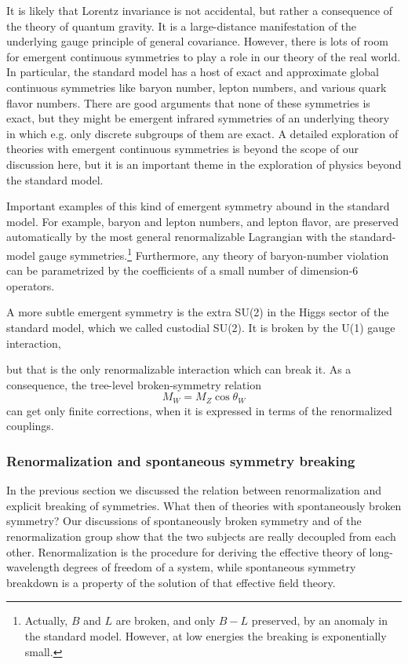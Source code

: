 It is likely that Lorentz invariance is not accidental, but rather a consequence
of the theory of quantum gravity. It is a large-distance manifestation of the
underlying gauge principle of general covariance. However, there is lots of
room for emergent continuous symmetries to play a role in our theory of the real
world. In particular, the standard model has a host of exact and approximate
global continuous symmetries like baryon number, lepton numbers, and various
quark flavor numbers. There are good arguments that none of these symmetries is
exact, but they might be emergent infrared symmetries of an underlying theory
in which e.g. only discrete subgroups of them are exact. A detailed exploration
of theories with emergent continuous symmetries is beyond the scope of our
discussion here, but it is an important theme in the exploration of physics
beyond the standard model.

Important examples of this kind of emergent symmetry abound in the standard
model. For example, baryon and lepton numbers, and lepton flavor, are preserved
automatically by the most general renormalizable Lagrangian with the
standard-model gauge symmetries.\footnote[19]{Actually, $B$ and $L$ are broken,
and only $B-L$ preserved, by an anomaly in the standard model. However, at low
energies the breaking is exponentially small.} Furthermore, any theory of
baryon-number violation can be parametrized by the coefficients of a small
number of dimension-6 operators.

A more subtle emergent symmetry is the extra SU(2) in the Higgs sector of the
standard model, which we called custodial SU(2). It is broken by the U(1) gauge
interaction,

but that is the only renormalizable interaction which can break it. As a
consequence, the tree-level broken-symmetry relation
\[
  M_W=M_Z\cos\theta_W
\]
can get only finite corrections, when it is expressed in terms of the
renormalized couplings.

\subsubsection{Renormalization and spontaneous symmetry breaking}

In the previous section we discussed the relation between renormalization and
explicit breaking of symmetries. What then of theories with spontaneously
broken symmetry? Our discussions of spontaneously broken symmetry and of the
renormalization group show that the two subjects are really decoupled from each
other. Renormalization is the procedure for deriving the effective theory of
long-wavelength degrees of freedom of a system, while spontaneous symmetry
breakdown is a property of the solution of that effective field theory.

